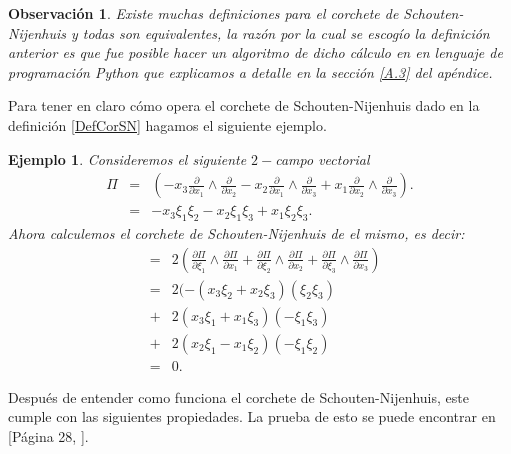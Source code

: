 \documentclass[a4paper,10pt]{book}
\newtheorem{obs}{Observaci\'on}
\newtheorem{eje}{Ejemplo}[chapter]
\begin{document}
\begin{obs}
Existe muchas definiciones para el corchete de Schouten-Nijenhuis y todas son equivalentes, la raz\'on por la cual se escog\'io la definici\'on anterior es que fue posible hacer un algoritmo de dicho c\'alculo en en lenguaje de programaci\'on Python que explicamos a detalle en la secci\'on \ref{A.3} del ap\'endice.  
\end{obs}

Para tener en claro c\'omo opera el corchete de Schouten-Nijenhuis dado en la definici\'on \ref{DefCorSN} hagamos el siguiente ejemplo.

\begin{eje}
Consideremos el siguiente $2-$campo vectorial  
\begin{eqnarray*}
     \Pi & = & \left(-x_{3} \frac{\partial}{\partial x_{1}}\wedge\frac{\partial}{\partial x_{2}} - x_{2}\frac{\partial}{\partial x_{1}}\wedge\frac{\partial}{\partial x_{3}} + x_{1}\frac{\partial}{\partial x_{2}}\wedge\frac{\partial}{\partial x_{3}}\right).\\
         & = & -x_{3}\xi_{1}\xi_{2} - x_{2}\xi_{1}\xi_{3} + x_{1}\xi_{2}\xi_{3}.
\end{eqnarray*}
Ahora calculemos el corchete de Schouten-Nijenhuis de el mismo, es decir:
    \begin{eqnarray*}
            [\Pi,\Pi] & = & 2\left(\frac{\partial\Pi}{\partial\xi_{1}}\wedge\frac{\partial\Pi}{\partial x_{1}} 
                            +\frac{\partial\Pi}{\partial\xi_{2}}\wedge\frac{\partial\Pi}{\partial x_{2}} + \frac{\partial\Pi}{\partial\xi_{3}}\wedge\frac{\partial\Pi}{\partial x_{3}} \right)\\
                      & = & 2(-(x_{3}\xi_{2}+x_{2}\xi_{3})(\xi_{2}\xi_{3})\\ 
                      & + & 2(x_{3}\xi_{1} + x_{1}\xi_{3})(-\xi_{1}\xi_{3})\\ 
                      & + & 2(x_{2}\xi_{1} - x_{1}\xi_{2})(-\xi_{1}\xi_{2})\\
                      & = & 0.
    \end{eqnarray*}
\end{eje}

Despu\'es de entender como funciona el corchete de Schouten-Nijenhuis, este cumple con las siguientes propiedades. La prueba de esto se puede encontrar en [P\'agina 28, \cite{Dufour}]. 
\end{document}
